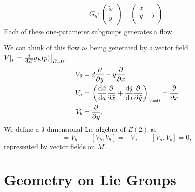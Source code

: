 \begin{example}[]
\begin{gather}
    G_b \colon
    \begin{pmatrix}
    \tilde{x} \\
    \tilde{y} \\
    \end{pmatrix} = 
    \begin{pmatrix}
    x \\
    y + b \\
    \end{pmatrix}.
  \end{gather}
  Each of these one-parameter subgroups generates a flow.
  \begin{figure}[tbhp]
    \centering
    \def\svgwidth{0.4\columnwidth}
    
    \caption{}
    \label{fig:l3f1}
  \end{figure}
  We can think of this flow as being generated by a vector field $V\rvert_{p} = \left.\dv{E} g_E(p)\right\rvert_{E = 0}$.
  \begin{align}
    V_\theta &= d \frac{\partial }{\partial y} - y \frac{\partial }{\partial x} \\
    V_a &= \left. \left( \dv{\tilde{x}}{a} \frac{\partial }{\partial \tilde{x}} + \dv{\tilde{y}}{a} \frac{\partial }{\partial \tilde{y}} \right) \right\rvert_{a = 0} = \frac{\partial }{\partial x} \\
    V_b &= \frac{\partial }{\partial y}.
  \end{align}
  We define a $3$-dimensional Lie algebra of $E(2)$ as
  \begin{equation}
    [V_a, V_\theta] = V_b \qquad [V_b, V_\theta] = -V_a \qquad [V_a, V_b] = 0,
  \end{equation} 
  represented by vector fields on $M$.
\end{example}

\section{Geometry on Lie Groups}%
\label{sec:geometry_on_lie_groups}

